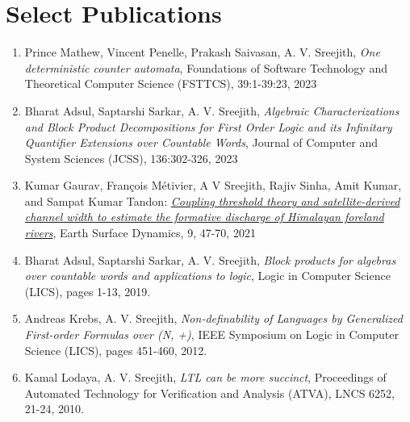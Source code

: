 \documentclass[11pt,a4paper,sans]{moderncv} %
\begin{document}
\section{Select Publications}
\begin{enumerate}
\item Prince Mathew, Vincent Penelle, Prakash Saivasan, A. V. Sreejith, \emph{One deterministic counter automata}, Foundations of Software Technology and Theoretical Computer Science (FSTTCS), 39:1-39:23, 2023
\item Bharat Adsul, Saptarshi Sarkar, A. V. Sreejith, \emph{Algebraic Characterizations and Block Product Decompositions for First Order Logic and its Infinitary Quantifier Extensions over Countable Words}, Journal of Computer and System Sciences (JCSS), 136:302-326, 2023
\item Kumar Gaurav, Fran\c{c}ois M\'etivier, A V Sreejith, Rajiv Sinha, Amit Kumar, and Sampat Kumar Tandon: \href{https://doi.org/10.5194/esurf-9-47-2021}{\emph{Coupling threshold theory and satellite-derived channel width to estimate the formative discharge of Himalayan foreland rivers}}, Earth Surface Dynamics, 9, 47-70, 2021
\item Bharat Adsul, Saptarshi Sarkar, A. V. Sreejith, \emph{Block products for algebras over countable words and applications to logic}, Logic in Computer Science (LICS), pages 1-13, 2019.
\item Andreas Krebs, A. V. Sreejith, \emph{Non-definability of Languages by Generalized First-order Formulas over (N, +)}, IEEE Symposium on Logic in Computer Science (LICS),  pages 451-460, 2012.
\item Kamal Lodaya, A. V. Sreejith, \emph{LTL can be more succinct}, Proceedings of Automated Technology for Verification and Analysis (ATVA), LNCS 6252, 21-24, 2010.
\end{enumerate}
\fi
\end{document}
